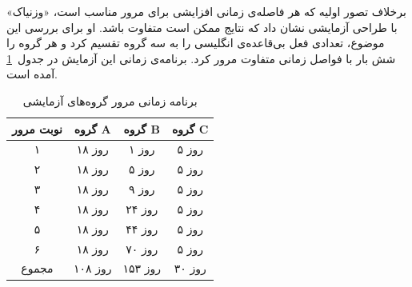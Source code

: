 \documentclass[12pt]{report}
\begin{document}






برخلاف تصور اولیه که هر فاصله‌ی زمانی افزایشی برای مرور مناسب است، «وزنیاک» با طراحی آزمایشی نشان داد که نتایج ممکن است متفاوت باشد. او برای بررسی این موضوع، تعدادی فعل بی‌قاعده‌ی انگلیسی را به سه گروه تقسیم کرد و هر گروه را شش بار با فواصل زمانی متفاوت مرور کرد. برنامه‌ی زمانی این آزمایش در جدول~\ref{tbl:repetition_schedule} آمده است.


\begin{table}[h!]
    \centering
    \caption{برنامه زمانی مرور گروه‌های آزمایشی}
    \label{tbl:repetition_schedule}
    \begin{tabular}{|c|c|c|c|}
        \hline
        نوبت مرور & گروه A & گروه B & گروه C \\
        \hline
        ۱ & ۱۸ روز & ۱ روز & ۵ روز \\
        \hline
        ۲ & ۱۸ روز & ۵ روز & ۵ روز \\
        \hline
        ۳ & ۱۸ روز & ۹ روز & ۵ روز \\
        \hline
        ۴ & ۱۸ روز & ۲۴ روز & ۵ روز \\
        \hline
        ۵ & ۱۸ روز & ۴۴ روز & ۵ روز \\
        \hline
        ۶ & ۱۸ روز & ۷۰ روز & ۵ روز \\
        \hline
        مجموع & ۱۰۸ روز & ۱۵۳ روز & ۳۰ روز \\
        \hline
    \end{tabular}
\end{table}
\end{document}
